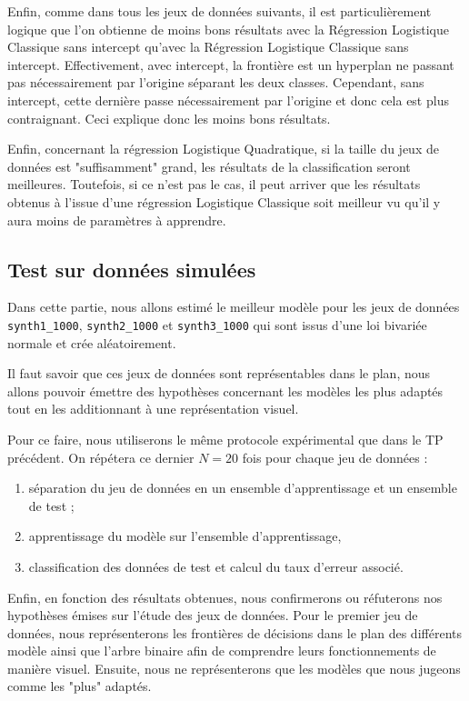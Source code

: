 \documentclass{article}
\begin{document}
\begin{multicols}{2}
Enfin, comme dans tous les jeux de données suivants, il est particulièrement logique que l'on obtienne de moins bons résultats avec la Régression Logistique Classique sans intercept qu'avec la Régression Logistique Classique sans intercept. Effectivement, avec intercept, la frontière est un hyperplan ne passant pas nécessairement par l'origine séparant les deux classes. Cependant, sans intercept, cette dernière passe nécessairement par l'origine et donc cela est plus contraignant. Ceci explique donc les moins bons résultats.

Enfin, concernant la régression Logistique Quadratique, si la taille du jeux de données est "suffisamment" grand, les résultats de la classification seront meilleures. Toutefois, si ce n'est pas le cas, il peut arriver que les résultats obtenus à l'issue d'une régression Logistique Classique soit meilleur vu qu'il y aura moins de paramètres à apprendre.

\subsection{Test sur données simulées}
\label{subsec_testsurdonneessimulees}

Dans cette partie, nous allons estimé le meilleur modèle pour les jeux de données \texttt{synth1\_1000}, \texttt{synth2\_1000} et \texttt{synth3\_1000} qui sont issus d'une loi bivariée normale et crée aléatoirement. 

Il faut savoir que ces jeux de données sont représentables dans le plan, nous allons pouvoir émettre des hypothèses concernant les modèles les plus adaptés tout en les additionnant à une représentation visuel. 

Pour ce faire, nous utiliserons le même protocole expérimental que dans le TP précédent. On répétera ce dernier $N = 20$ fois pour chaque jeu de données :
\begin{enumerate}
 \item séparation du jeu de données en un ensemble d’apprentissage et un ensemble de test ;
 \item apprentissage du modèle sur l’ensemble d’apprentissage,
 \item classification des données de test et calcul du taux d’erreur associé.
\end{enumerate}

Enfin, en fonction des résultats obtenues, nous confirmerons ou réfuterons nos hypothèses émises sur l'étude des jeux de données. Pour le premier jeu de données, nous représenterons les frontières de décisions dans le plan des différents modèle ainsi que l'arbre binaire afin de comprendre leurs fonctionnements de manière visuel. Ensuite, nous ne représenterons que les modèles que nous jugeons comme les "plus" adaptés.


\end{multicols}
\end{document}
